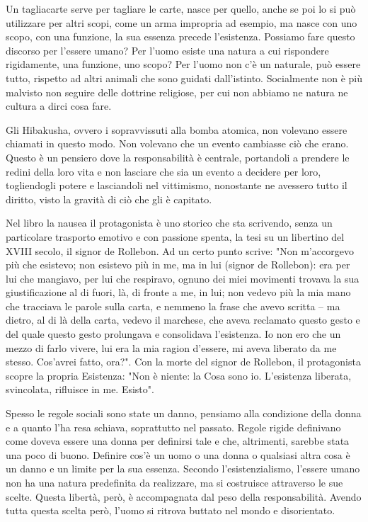 \documentclass[12pt]{book} %
\begin{document}
Un tagliacarte serve per tagliare le carte, nasce per quello, anche se poi lo si può utilizzare per altri scopi, come un
arma impropria ad esempio, ma nasce con uno scopo, con una funzione, la sua essenza precede l'esistenza. Possiamo fare
questo discorso per l'essere umano? Per l'uomo esiste una natura a cui rispondere rigidamente, una funzione, uno scopo?
Per l'uomo non c'è un naturale, può essere tutto, rispetto ad altri animali che sono
guidati dall'istinto. Socialmente non è più malvisto non seguire delle dottrine religiose, per cui non abbiamo ne
natura ne cultura a dirci cosa fare. 

Gli Hibakusha, ovvero i sopravvissuti alla bomba atomica, non volevano essere chiamati in questo modo. Non volevano che
un evento cambiasse ciò che erano. Questo è un pensiero dove la responsabilità è centrale, portandoli a prendere le
redini della loro vita e non lasciare che sia un evento a decidere per loro, togliendogli potere e lasciandoli nel
vittimismo, nonostante ne avessero tutto il diritto, visto la gravità di ciò che gli è capitato. 

Nel libro la nausea il protagonista è uno storico che sta scrivendo,
senza un particolare trasporto emotivo e con passione spenta, la tesi su un libertino del XVIII secolo, il signor de
Rollebon. Ad un certo punto scrive: "Non m'accorgevo più che esistevo; non
esistevo più in me, ma in lui (signor de Rollebon): era per lui che mangiavo, per lui che respiravo, ognuno dei miei
movimenti trovava la sua giustificazione al di fuori, là, di fronte a me, in lui; non vedevo più la mia mano che
tracciava le parole sulla carta, e nemmeno la frase che avevo scritta – ma dietro, al di là della carta, vedevo il
marchese, che aveva reclamato questo gesto e del quale questo gesto prolungava e consolidava
l'esistenza. Io non ero che un mezzo di farlo vivere, lui era la mia ragion
d'essere, mi aveva liberato da me stesso. Cos'avrei fatto,
ora?". Con la morte del signor de Rollebon, il protagonista scopre la propria Esistenza:
"Non è niente: la Cosa sono io. L'esistenza liberata, svincolata, rifluisce
in me. Esisto". 

Spesso le regole sociali sono state un danno, pensiamo alla condizione della donna e a quanto l'ha resa schiava,
soprattutto nel passato. Regole rigide definivano come doveva essere una donna per definirsi tale e che, altrimenti,
sarebbe stata una poco di buono. Definire cos'è un uomo o una donna o qualsiasi altra cosa è un danno e un limite per
la sua essenza. Secondo l’esistenzialismo, l’essere umano non ha una natura predefinita da realizzare, ma si costruisce attraverso le sue scelte. Questa libertà, però, è accompagnata dal peso della responsabilità. Avendo tutta questa scelta però, l'uomo
si ritrova buttato nel mondo e disorientato.
\end{document}
